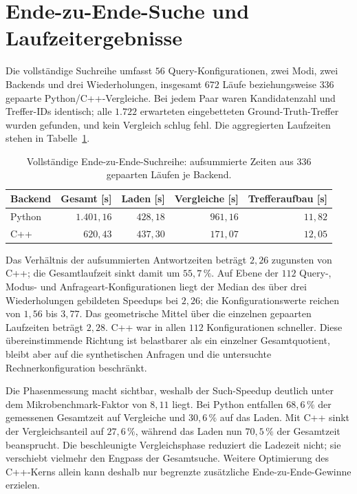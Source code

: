 \documentclass[a4paper,12pt, twoside]{report}
\theoremstyle{definition}
\begin{document}
\section{Ende-zu-Ende-Suche und Laufzeitergebnisse}
\label{sec:multiomics_search}

Die vollständige Suchreihe umfasst $56$ Query-Konfigurationen, zwei Modi, zwei Backends und drei Wiederholungen, insgesamt $672$ Läufe beziehungsweise $336$ gepaarte Python/C++-Vergleiche. Bei jedem Paar waren Kandidatenzahl und Treffer-IDs identisch; alle $1.722$ erwarteten eingebetteten Ground-Truth-Treffer wurden gefunden, und kein Vergleich schlug fehl. Die aggregierten Laufzeiten stehen in Tabelle~\ref{tab:multiomics_search_totals}.

\begin{table}[!htbp]
\centering
\small
\caption{Vollständige Ende-zu-Ende-Suchreihe: aufsummierte Zeiten aus 336 gepaarten Läufen je Backend.}
\label{tab:multiomics_search_totals}
\begin{tabular}{@{}lrrrr@{}}
\toprule
Backend & Gesamt [s] & Laden [s] & Vergleiche [s] & Trefferaufbau [s] \\
\midrule
Python & $1.401{,}16$ & $428{,}18$ & $961{,}16$ & $11{,}82$ \\
C++ & $620{,}43$ & $437{,}30$ & $171{,}07$ & $12{,}05$ \\
\bottomrule
\end{tabular}
\end{table}

Das Verhältnis der aufsummierten Antwortzeiten beträgt $2{,}26$ zugunsten von C++; die Gesamtlaufzeit sinkt damit um $55{,}7\,\%$. Auf Ebene der $112$ Query-, Modus- und Anfrageart-Konfigurationen liegt der Median des über drei Wiederholungen gebildeten Speedups bei $2{,}26$; die Konfigurationswerte reichen von $1{,}56$ bis $3{,}77$. Das geometrische Mittel über die einzelnen gepaarten Laufzeiten beträgt $2{,}28$. C++ war in allen $112$ Konfigurationen schneller. Diese übereinstimmende Richtung ist belastbarer als ein einzelner Gesamtquotient, bleibt aber auf die synthetischen Anfragen und die untersuchte Rechnerkonfiguration beschränkt.

Die Phasenmessung macht sichtbar, weshalb der Such-Speedup deutlich unter dem Mikrobenchmark-Faktor von $8{,}11$ liegt. Bei Python entfallen $68{,}6\,\%$ der gemessenen Gesamtzeit auf Vergleiche und $30{,}6\,\%$ auf das Laden. Mit C++ sinkt der Vergleichsanteil auf $27{,}6\,\%$, während das Laden nun $70{,}5\,\%$ der Gesamtzeit beansprucht. Die beschleunigte Vergleichsphase reduziert die Ladezeit nicht; sie verschiebt vielmehr den Engpass der Gesamtsuche. Weitere Optimierung des C++-Kerns allein kann deshalb nur begrenzte zusätzliche Ende-zu-Ende-Gewinne erzielen.
\end{document}
